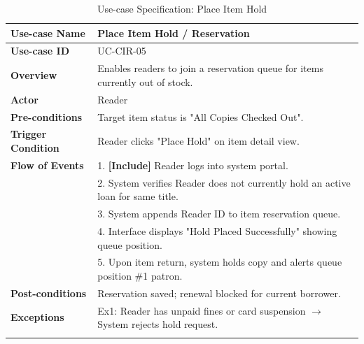\begin{longtable}{|p{3.5cm}|p{11.5cm}|}
    \hline
    \textbf{Use-case Name} & \textbf{Place Item Hold / Reservation} \\
    \hline
    \textbf{Use-case ID} & UC-CIR-05 \\
    \hline
    \textbf{Overview} & Enables readers to join a reservation queue for items currently out of stock. \\
    \hline
    \textbf{Actor} & Reader \\
    \hline
    \textbf{Pre-conditions} & Target item status is "All Copies Checked Out". \\
    \hline
    \textbf{Trigger Condition} & Reader clicks "Place Hold" on item detail view. \\
    \hline
    \textbf{Flow of Events} & 
    1. \textbf{[Include]} Reader logs into system portal.\\ 
 & 
    2. System verifies Reader does not currently hold an active loan for same title.\\ 
 & 
    3. System appends Reader ID to item reservation queue.\\ 
 & 
    4. Interface displays "Hold Placed Successfully" showing queue position.\\ 
 & 
    5. Upon item return, system holds copy and alerts queue position \#1 patron. \\
    \hline
    \textbf{Post-conditions} & Reservation saved; renewal blocked for current borrower. \\
    \hline
    \textbf{Exceptions} & 
    Ex1: Reader has unpaid fines or card suspension $\rightarrow$ System rejects hold request. \\
    \hline
    \caption{Use-case Specification: Place Item Hold} \\
\end{longtable}

